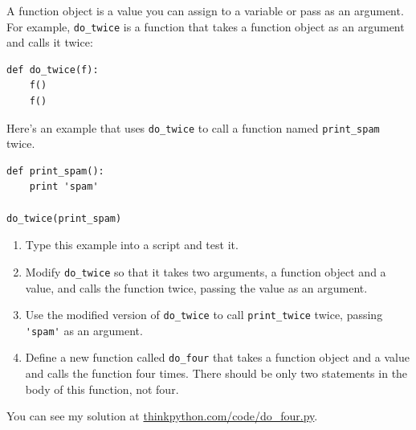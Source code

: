 \documentclass[10pt]{book}
\begin{document}
\begin{ex}

A function object is a value you can assign to a variable
or pass as an argument.  For example, \verb"do_twice" is a function
that takes a function object as an argument and calls it twice:

\beforeverb
\begin{verbatim}
def do_twice(f):
    f()
    f()
\end{verbatim}
\afterverb

Here's an example that uses \verb"do_twice" to call a function
named \verb"print_spam" twice.

\beforeverb
\begin{verbatim}
def print_spam():
    print 'spam'

do_twice(print_spam)
\end{verbatim}
\afterverb

\begin{enumerate}

\item Type this example into a script and test it.

\item Modify \verb"do_twice" so that it takes two arguments, a
function object and a value, and calls the function twice,
passing the value as an argument.

\item Use the modified version of \verb"do_twice" to call
\verb"print_twice" twice, passing \verb"'spam'" as an argument.

\item Define a new function called 
\verb"do_four" that takes a function object and a value
and calls the function four times.  There should be only
two statements in the body of this function, not four.

\end{enumerate}

You can see my solution at \url{thinkpython.com/code/do_four.py}.

\end{ex}
\end{document}

